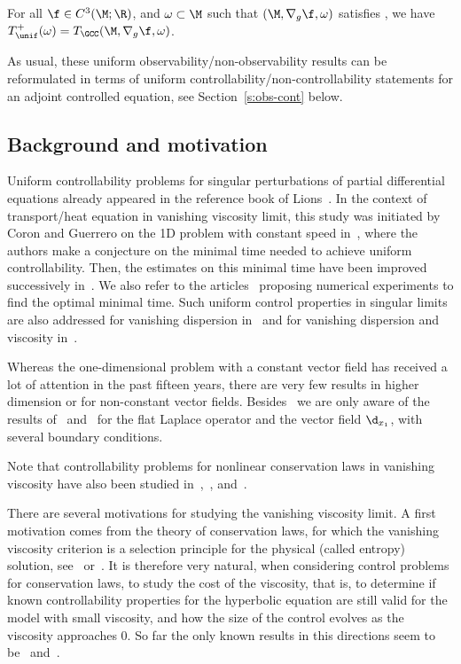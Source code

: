 \begin{theorem}
\label{t:positive-intro}
For all $\f \in C^3(\M;\R)$, and $\omega \subset \M$ such that $(\M,\nabla_g\f,\omega)$ satisfies \pGCC, we have $T_{\unif}^+(\omega) = T_{\GCC}(\M,\nabla_g\f,\omega)$.
\end{theorem}

As usual, these uniform observability/non-observability results can be reformulated in terms of uniform controllability/non-controllability statements for an adjoint controlled equation, see Section~\ref{s:obs-cont} below.

\subsection{Background and motivation}
\label{s:motiv}
Uniform controllability problems for singular perturbations of partial differential equations already appeared in the reference book of Lions~\cite[Chap.\,3]{Lio2:88}. In the context of transport/heat equation in vanishing viscosity limit, this study was initiated by Coron and Guerrero on the 1D problem with constant speed in~\cite{CG:05}, where the authors make a conjecture on the minimal time needed to achieve uniform controllability. Then, the estimates on this minimal time have been improved successively in~\cite{Gla:10,Lissy:12,Lissy:14,Lissy:15}.
We also refer to the arti\-cles~\cite{Munch:18,YM:19,YM:19bis} proposing numerical experiments to find the optimal minimal time.
Such uniform control properties in singular limits are also addressed for vanishing dispersion in~\cite{GG:08} and for vanishing dispersion and viscosity in~\cite{GG:09}.

Whereas the one-dimensional problem with a constant vector field has received a lot of attention in the past fifteen years, there are very few results in higher dimension or for non-constant vector fields. Besides~\cite{GL:07} we are only aware of the results of~\cite{Barcena:20} and~\cite{Barcena:21} for the flat Laplace operator and the vector field $\d_{x_1}$, with several boundary conditions.

Note that controllability problems for nonlinear conservation laws in vanishing viscosity have also been studied in~\cite{GG:07},~\cite{Lea:11}, and~\cite{Marbach:14}.

There are several motivations for studying the vanishing viscosity limit.
A first motivation comes from the theory of conservation laws, for which the vanishing viscosity criterion is a selection principle for the physical (called entropy) solution, see~\cite{Kru:70} or~\cite[Chap.\,6]{Daf:00}.
It is therefore very natural, when considering control problems for conservation laws, to study the cost of the viscosity,
that is, to determine if known controllability properties for the hyperbolic equation are still valid for the model with
small viscosity, and how the size of the control evolves as the viscosity approaches $0$. So far the only known results in this directions seem to be~\cite{GG:07} and~\cite{Lea:11}.

